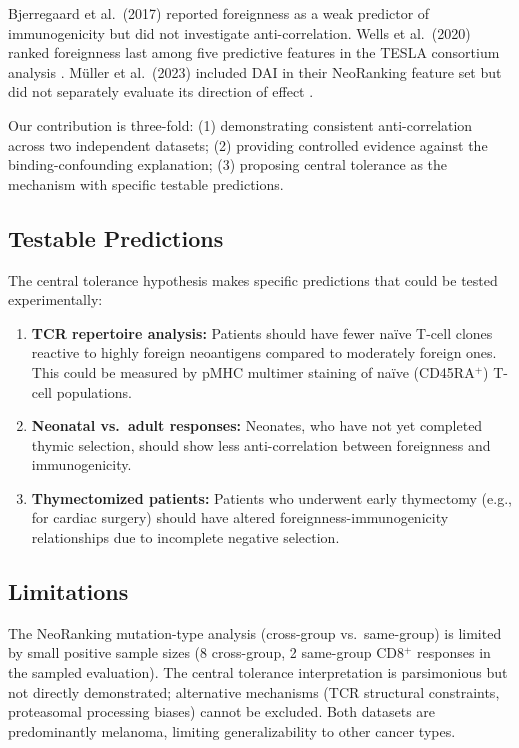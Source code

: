 \documentclass[11pt,twocolumn]{article}
\begin{document}
Bjerregaard et al.\ (2017) reported foreignness as a weak predictor of immunogenicity but did not investigate anti-correlation. Wells et al.\ (2020) ranked foreignness last among five predictive features in the TESLA consortium analysis \cite{wells2020tesla}. M\"{u}ller et al.\ (2023) included DAI in their NeoRanking feature set but did not separately evaluate its direction of effect \cite{muller2023neoranking}.

Our contribution is three-fold: (1) demonstrating consistent anti-correlation across two independent datasets; (2) providing controlled evidence against the binding-confounding explanation; (3) proposing central tolerance as the mechanism with specific testable predictions.

\subsection{Testable Predictions}

The central tolerance hypothesis makes specific predictions that could be tested experimentally:

\begin{enumerate}[leftmargin=*,topsep=0pt,itemsep=2pt]
\item \textbf{TCR repertoire analysis:} Patients should have fewer na\"{i}ve T-cell clones reactive to highly foreign neoantigens compared to moderately foreign ones. This could be measured by pMHC multimer staining of na\"{i}ve (CD45RA$^{+}$) T-cell populations.
\item \textbf{Neonatal vs.\ adult responses:} Neonates, who have not yet completed thymic selection, should show less anti-correlation between foreignness and immunogenicity.
\item \textbf{Thymectomized patients:} Patients who underwent early thymectomy (e.g., for cardiac surgery) should have altered foreignness-immunogenicity relationships due to incomplete negative selection.
\end{enumerate}

\subsection{Limitations}

The NeoRanking mutation-type analysis (cross-group vs.\ same-group) is limited by small positive sample sizes (8 cross-group, 2 same-group CD8$^{+}$ responses in the sampled evaluation). The central tolerance interpretation is parsimonious but not directly demonstrated; alternative mechanisms (TCR structural constraints, proteasomal processing biases) cannot be excluded. Both datasets are predominantly melanoma, limiting generalizability to other cancer types.
\end{document}
